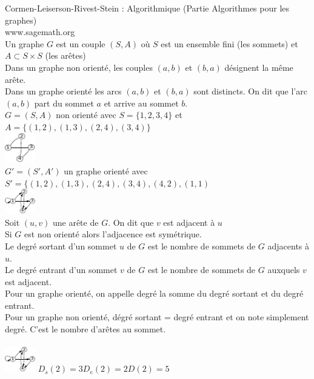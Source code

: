  Cormen-Leiserson-Rivest-Stein : Algorithmique (Partie Algorithmes pour les graphes) \\
www.sagemath.org \\

 Un graphe $G$ est un couple $(S,A)$ où $S$ est un ensemble fini (les sommets) et $A \subset S\times S$ (les arêtes) \\
Dans un graphe non orienté, les couples $(a,b)$ et $(b,a)$ désignent la même arête. \\
Dans un graphe orienté les arcs $(a,b)$ et $(b,a)$ sont distincts. On dit que l'arc $(a,b)$ part du sommet $a$ et arrive au sommet $b$.\\

 $G = (S,A)$ non orienté avec $S = \{1,2,3,4\}$ et $A=\{(1,2),(1,3),(2,4),(3,4)\}$\\
\includegraphics[width=50px]{Images/fig1.pdf}\\

 $G'=(S',A')$ un graphe orienté avec $S'=\{(1,2),(1,3),(2,4),(3,4),(4,2),(1,1)$\\
\includegraphics[width=50px]{Images/fig2.pdf}\\

 Soit $(u,v)$ une arête de $G$. On dit que $v$ est adjacent à $u$\\
 Si $G$ est non orienté alors l'adjacence est symétrique.\\

 Le degré sortant d'un sommet $u$ de $G$ est le nombre de sommets de $G$ adjacents à $u$. \\
Le degré entrant d'un sommet $v$ de $G$ est le nombre de sommets de $G$ auxquels $v$ est adjacent. \\
Pour un graphe orienté, on appelle degré la somme du degré sortant et du degré entrant. \\
Pour un graphe non orienté, dégré sortant = degré entrant et on note simplement degré. C'est le nombre d'arêtes  au sommet.\\

\\
\includegraphics[width=50px]{Images/fig2.pdf}
$D_s(2) = 3 D_e(2) = 2 D(2) = 5$ \\

